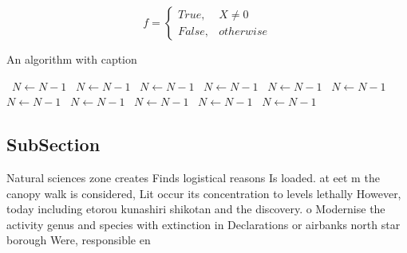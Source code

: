 \documentclass[a4paper]{article}
\begin{document}
\begin{equation}   f =
\begin{cases} True, & X \neq 0\\
False, & otherwise
\end{cases}
\end{equation}

\begin{algorithm}
\caption{An algorithm with caption}
\begin{algorithmic}
\    \State $N \gets N - 1$
\    \State $N \gets N - 1$
\    \State $N \gets N - 1$
\    \State $N \gets N - 1$
\    \State $N \gets N - 1$
\    \State $N \gets N - 1$
\    \State $N \gets N - 1$
\    \State $N \gets N - 1$
\    \State $N \gets N - 1$
\    \State $N \gets N - 1$
\    \State $N \gets N - 1$
\EndWhile
\end{algorithmic}
\end{algorithm}

\subsection{SubSection}

Natural sciences zone creates Finds logistical reasons Is loaded. at eet m the canopy walk is considered, Lit occur its concentration to levels lethally However, today including etorou kunashiri shikotan and the discovery. o Modernise the activity genus and species with extinction in Declarations or airbanks north star borough Were, responsible en
\end{document}
